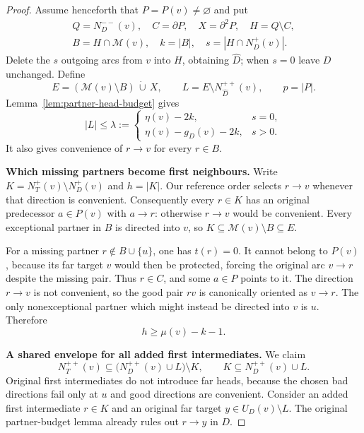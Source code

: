 \begin{proof}
Assume henceforth that $P=P(v)\ne\varnothing$ and put
\[
 \begin{gathered}
 Q=N_D^{--}(v),\quad C=\partial P,\quad X=\partial^2P,\quad H=Q\setminus C,\\
 B=H\cap\mathcal M(v),\quad k=|B|,\quad s=|H\cap N_D^+(v)|.
 \end{gathered}
\]
Delete the $s$ outgoing arcs from $v$ into $H$, obtaining
$\widehat D$; when $s=0$ leave $D$ unchanged. Define
\[
 E=(\mathcal M(v)\setminus B)\,\dot\cup\,X,
 \qquad L=E\setminus N^{++}_{\widehat D}(v),
 \qquad p=|P|.
\]
Lemma~\ref{lem:partner-head-budget} gives
\begin{equation}\label{eq:two-support-lambda}
 |L|\le\lambda:=
 \begin{cases}
  \eta(v)-2k,&s=0,\\
  \eta(v)-g_D(v)-2k,&s>0.
 \end{cases}
\end{equation}
It also gives convenience of $r\to v$ for every $r\in B$.

\par\medskip\noindent\textbf{Which missing partners become first neighbours.}\quad 
Write $K=N_T^+(v)\setminus N_D^+(v)$ and $h=|K|$.
Our reference order selects $r\to v$ whenever that direction is
convenient. Consequently every $r\in K$ has an original predecessor
$a\in P(v)$ with $a\to r$: otherwise $r\to v$ would be convenient.
Every exceptional partner in $B$ is directed into $v$, so
$K\subseteq\mathcal M(v)\setminus B\subseteq E$.

For a missing partner $r\notin B\cup\{u\}$, one has $t(r)=0$.
It cannot belong to $P(v)$, because its far target $v$ would then be
protected, forcing the original arc $v\to r$ despite the missing pair.
Thus $r\in C$, and some $a\in P$ points to it. The direction
$r\to v$ is not convenient, so the good pair $rv$ is canonically
oriented as $v\to r$. The only nonexceptional partner which might
instead be directed into $v$ is $u$. Therefore
\begin{equation}\label{eq:two-support-first-count}
 h\ge\mu(v)-k-1.
\end{equation}

\par\medskip\noindent\textbf{A shared envelope for all added first intermediates.}\quad 
We claim
\begin{equation}\label{eq:two-support-shared-envelope}
 N_T^{++}(v)\subseteq
 \bigl(N_D^{++}(v)\cup L\bigr)\setminus K,
 \qquad K\subseteq N_D^{++}(v)\cup L.
\end{equation}
Original first intermediates do not introduce far heads, because the
chosen bad directions fail only at $u$ and good directions are
convenient. Consider an added first intermediate $r\in K$ and an
original far target $y\in U_D(v)\setminus L$.
The original partner-budget lemma already rules out $r\to y$ in $D$.


\end{proof}
